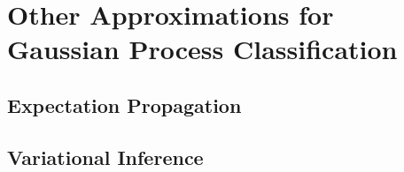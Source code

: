 \chapter{Other Approximations for Gaussian Process Classification}
\label{Appendix:OtherApproximationsGaussianProcessClassification}

	\section{Expectation Propagation}
	
	\section{Variational Inference}
		